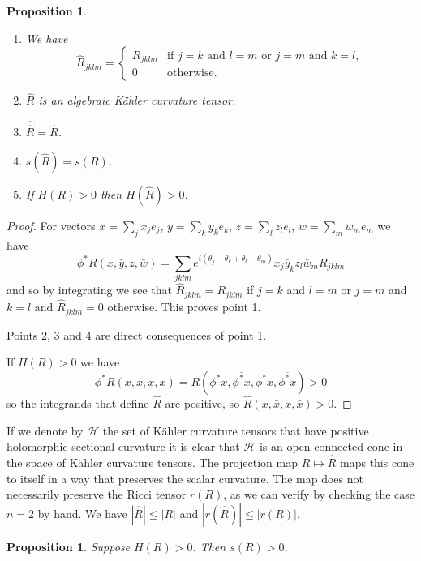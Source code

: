 \documentclass[11pt]{amsart}
\newtheorem{prop}[theo]{Proposition}
\theoremstyle{definition}
\newcommand{\cc}[1]{\mathcal{#1}}
\def\ov#1{\overline{#1}}
\begin{document}
\begin{prop}
\begin{enumerate}
\item
We have
$$
\widehat R_{jklm} =
\begin{cases}
R_{jklm} & \text{if $j=k$ and $l=m$ or $j=m$ and $k=l$},
\\
0 & \text{otherwise.}
\end{cases}
$$

\item
$\widehat R$ is an algebraic K\"ahler curvature tensor.

\item
$\widehat{\widehat R} = \widehat R$.

\item
$s(\widehat{R}) = s(R)$.

\item
If $H(R) > 0$ then $H(\widehat R) > 0$.
\end{enumerate}
\end{prop}

\begin{proof}
For vectors $x=\sum_j x_j e_j$, $y = \sum_k y_k e_k$, $z = \sum_l z_l e_l$,
$w = \sum_m w_m e_m$ we have
$$
\phi^*R(x, \bar y, z, \bar w)
= \sum_{jklm} e^{i(\theta_j-\theta_k+\theta_l-\theta_m)}
x_j \bar y_k z_l \bar w_m R_{jklm}
$$
and so by integrating we see that
$\widehat R_{jklm} = R_{jklm}$ if $j=k$ and $l=m$ or $j=m$ and $k=l$ and
$\widehat R_{jklm} = 0$ otherwise.
This proves point 1.

Points 2, 3 and 4 are direct consequences of point 1.

If $H(R) > 0$ we have
$$
\phi^*R(x, \bar x, x, \bar x)
= R(\phi^* x, \ov{\phi^* x}, \phi^* x, \ov{\phi^* x}) > 0
$$
so the integrands that define $\widehat R$ are positive, so $\widehat R(x, \bar
x, x, \bar x) > 0$.
\end{proof}

If we denote by $\cc H$ the set of K\"ahler curvature tensors that have positive
holomorphic sectional curvature it is clear that $\cc H$ is an open connected
cone in the space of K\"ahler curvature tensors.
The projection map $R \mapsto \widehat R$ maps this cone to itself in a way
that preserves the scalar curvature.
The map does not necessarily preserve the Ricci tensor $r(R)$, as we can verify
by checking the case $n = 2$ by hand.
We have $|\widehat R| \leq |R|$ and $|r(\widehat R)| \leq |r(R)|$.


\begin{prop}
Suppose $H(R) > 0$. Then $s(R) > 0$.
\end{prop}
\end{document}
